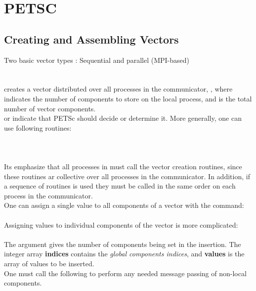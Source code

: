 \section{PETSC}
\subsection{Creating and Assembling Vectors}
Two basic vector types : Sequential and parallel (MPI-based) \\
 \\
 \\
creates a vector distributed over all processes in the communicator, , where  indicates the number of components to store on the local process, and  is the total number of vector components.\\
 or  indicate that PETSc should decide or determine it. More generally, one can use following routines:\\
\\
\\
 \\
Its emphasize that all processes in  must call the vector creation routines, since these routines ar  collective over all processes in the communicator. In addition, if a sequence of  routines is used they must be called in the same order on each process in the communicator. \\
One can assign a single value to all components of a vector with the command: \\
 \\
Assigning values to individual components of the vector is more complicated: \\
 \\
The argument  gives the number of components being set in the insertion. The integer array \textbf{indices} contains the \textit{global components indices}, and \textbf{values} is the array of values to be inserted.\\
One must call the following to perform any needed message passing of non-local components.\\

